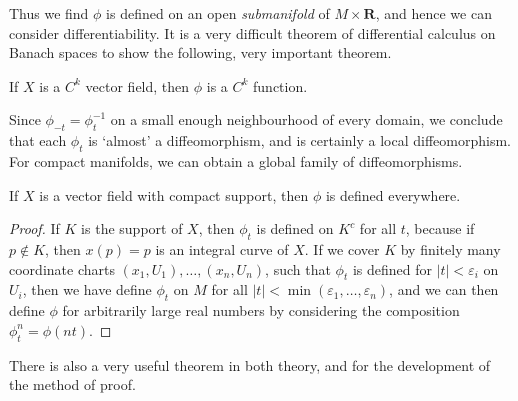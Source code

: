 Thus we find $\phi$ is defined on an open {\it submanifold} of $M \times \mathbf{R}$, and hence we can consider differentiability. It is a very difficult theorem of differential calculus on Banach spaces to show the following, very important theorem.

\begin{theorem}
    If $X$ is a $C^k$ vector field, then $\phi$ is a $C^k$ function.
\end{theorem}

Since $\phi_{-t} = \phi_t^{-1}$ on a small enough neighbourhood of every domain, we conclude that each $\phi_t$ is `almost' a diffeomorphism, and is certainly a local diffeomorphism. For compact manifolds, we can obtain a global family of diffeomorphisms.

\begin{theorem}
    If $X$ is a vector field with compact support, then $\phi$ is defined everywhere.
\end{theorem}
\begin{proof}
    If $K$ is the support of $X$, then $\phi_t$ is defined on $K^c$ for all $t$, because if $p \not \in K$, then $x(p) = p$ is an integral curve of $X$. If we cover $K$ by finitely many coordinate charts $(x_1,U_1), \dots, (x_n,U_n)$, such that $\phi_t$ is defined for $|t| < \varepsilon_i$ on $U_i$, then we have define $\phi_t$ on $M$ for all $|t| < \min(\varepsilon_1, \dots, \varepsilon_n)$, and we can then define $\phi$ for arbitrarily large real numbers by considering the composition $\phi^n_t = \phi(nt)$.
\end{proof}

There is also a very useful theorem in both theory, and for the development of the method of proof.


